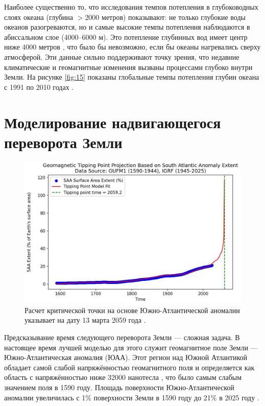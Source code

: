 \documentclass[10pt,twocolumn,letterpaper]{article}
\begin{document}
Наиболее существенно то, что исследования темпов потепления в глубоководных слоях океана (глубина $>$2000 метров) показывают: не только глубокие воды океанов разогреваются, но и самые высокие темпы потепления наблюдаются в абиссальном слое (4000–6000 м). Это потепление глубинных вод имеет центр ниже 4000 метров \cite{132,129}, что было бы невозможно, если бы океаны нагревались сверху атмосферой. Эти данные сильно поддерживают точку зрения, что недавние климатические и геомагнитные изменения вызваны процессами глубоко внутри Земли. На рисунке \ref{fig:15} показаны глобальные темпы потепления глубин океана с 1991 по 2010 годах \cite{132}.

\section{Моделирование надвигающегося переворота Земли}

\begin{figure}[b]
\begin{center}
   \includegraphics[width=1\linewidth]{saa-crop.jpeg}
\end{center}
   \caption{Расчет критической точки на основе Южно-Атлантической аномалии указывает на дату 13 марта 2059 года \cite{125,126}.}
\label{fig:16}
\label{fig:onecol}
\end{figure}

Предсказывание время следующего переворота Земли — сложная задача. В настоящее время лучшей моделью для этого служит геомагнитное поле Земли — Южно-Атлантическая аномалия (ЮАА). Этот регион над Южной Атлантикой обладает самой слабой напряжённостью геомагнитного поля и определяется как область с напряжённостью ниже 32000 нанотесла \cite{135}, что было самым слабым значением поля в 1590 году. Площадь поверхности Южно-Атлантической аномалии увеличилась с 1\% поверхности Земли в 1590 году до 21\% в 2025 году \cite{136}.
\end{document}
